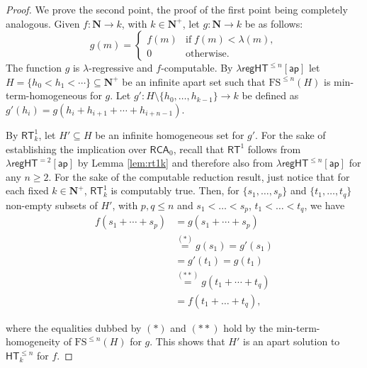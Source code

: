 \documentclass[a4paper,11pt]{article}
\newcommand\Nat{\mathbf{N}}
\newcommand\RCA{\mathsf{RCA}}
\newcommand\HT{\mathsf{HT}}
\newcommand\RT{\mathsf{RT}}
\newcommand\regHT{\mathsf{regHT}}
\newcommand\FS{\mathrm{FS}}
\newcommand\ap{\mathsf{ap}}
\begin{document}
\begin{proof}
We prove the second point, the proof of the first point being completely analogous. Given $f: \Nat \to k$, with $k\in\Nat^+$, let $g:\Nat \to k$ be as follows: 
$$
    g(m) =
    \begin{cases}
      f(m) & \mathrm{if} \; f(m) < \lambda(m), \\
      0        & \text{otherwise.}
    \end{cases}
$$
The function $g$ is $\lambda$-regressive and $f$-computable. 
By $\lambda\regHT^{\leq n}[\ap]$ let $H=\{h_0 < h_1 <  \cdots\}\subseteq\Nat^+$ be an infinite apart set such that $\FS^{\leq n}(H)$ is
min-term-homogeneous for $g$. Let $g': H \setminus \{h_0, \dots, h_{k-1}\} \to k$ be defined as 
$g'(h_i)=g(h_i + h_{i+1} + \cdots + h_{i+n-1})$. 

By $\RT^1_k$, let $H' \subseteq H$ be an infinite homogeneous set for $g'$. For the sake of establishing the implication over $\RCA_0$, 
recall that $\RT^1$ follows from $\lambda\regHT^{=2}[\ap]$ by Lemma \ref{lem:rt1k} and therefore also from $\lambda\regHT^{\leq n}[\ap]$ for any $n\geq 2$. For the sake of the computable reduction result, just notice that for each 
fixed $k\in \Nat^+$, $\RT^1_k$ is computably true. Then, 
for $\{s_1, \dots, s_p\}$ and $\{t_1, \dots, t_q\}$ non-empty subsets of $H'$, with $p,q \leq n$ and $s_1 < \dots < s_p$, $t_1 < \dots < t_q$, we have
\begin{equation*}
\begin{split}
f(s_1+\cdots+s_p) & = g(s_1+\cdots+s_p)\\  
& \stackrel{(*)}{=} g(s_1) = g'(s_1) \\
& = g'(t_1) = g(t_1) \\
& \stackrel{(**)}{=} g(t_1+\cdots+t_q)\\ 
& = f(t_1+\dots+t_q),
\end{split}
\end{equation*}

where the equalities dubbed by $(*)$ and $(**)$ hold by the min-term-homogeneity of $\FS^{\leq n}(H)$ for $g$.
This shows that $H'$ is an apart solution to $\HT^{\leq n}_k$ for $f$.
\end{proof}
\end{document}
